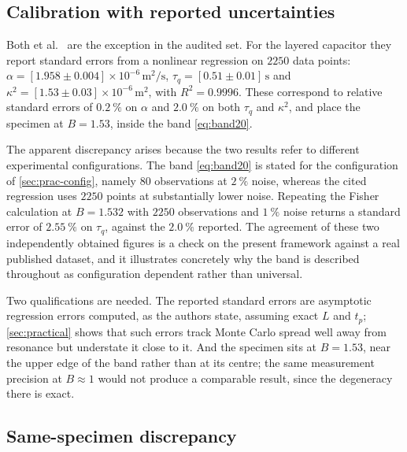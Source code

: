 \documentclass[preprint,12pt,a4paper]{elsarticle}
\theoremstyle{plain}
\theoremstyle{definition}
\theoremstyle{remark}
\newcommand{\tq}{\tau_{q}}
\newcommand{\kk}{\kappa^{2}}
\newcommand{\Bnum}{B}
\begin{document}
\subsection{Calibration with reported uncertainties}
\label{sec:cal-uncertainty}

Both et al.\ \cite{Both2016} are the exception in the audited set. For the
layered capacitor they report standard errors from a nonlinear regression on
$2250$ data points: $\alpha = [1.958 \pm 0.004]\times10^{-6}\,
\si{\metre\squared\per\second}$, $\tq = [0.51 \pm 0.01]\,\si{\second}$ and
$\kk = [1.53 \pm 0.03]\times10^{-6}\,\si{\metre\squared}$, with
$R^{2} = 0.9996$. These correspond to relative standard errors of
$\SI{0.2}{\percent}$ on $\alpha$ and $\SI{2.0}{\percent}$ on both $\tq$ and
$\kk$, and place the specimen at $\Bnum = 1.53$, inside the band
\eqref{eq:band20}.

The apparent discrepancy arises because the two results refer to different
experimental configurations. The band \eqref{eq:band20} is stated for the
configuration of \cref{sec:prac-config}, namely $80$ observations at
$\SI{2}{\percent}$ noise, whereas the cited regression uses $2250$ points at
substantially lower noise. Repeating the Fisher calculation at
$\Bnum = 1.532$ with $2250$ observations and $\SI{1}{\percent}$ noise returns a
standard error of $\SI{2.55}{\percent}$ on $\tq$, against the
$\SI{2.0}{\percent}$ reported. The agreement of these two independently
obtained figures is a check on the present framework against a real published
dataset, and it illustrates concretely why the band is described throughout as
configuration dependent rather than universal.

Two qualifications are needed. The reported standard errors are asymptotic
regression errors computed, as the authors state, assuming exact $L$ and
$t_{p}$; \cref{sec:practical} shows that such errors track Monte Carlo spread
well away from resonance but understate it close to it. And the specimen sits
at $\Bnum = 1.53$, near the upper edge of the band rather than at its centre;
the same measurement precision at $\Bnum \approx 1$ would not produce a
comparable result, since the degeneracy there is exact.

\subsection{Same-specimen discrepancy}
\label{sec:cal-discrepancy}
\end{document}
